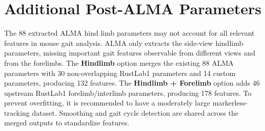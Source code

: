 \documentclass[11pt]{article}
\renewcommand{\[}{%
  \par\smallskip\noindent
  \begin{center}%
  \setlength{\fboxsep}{5pt}%
  \setlength{\fboxrule}{0.35pt}%
  \begin{lrbox}{\almaEquationBox}%
  $\displaystyle
}
\renewcommand{\]}{%
  $%
  \end{lrbox}%
  \fcolorbox{equationLine}{equationBack}{\usebox{\almaEquationBox}}%
  \end{center}%
  \smallskip\par
}
\begin{document}
\section{Additional Post-ALMA Parameters}

The 88 extracted ALMA hind limb parameters may not account for all relevant features in mouse gait analysis. ALMA only extracts the side-view hindlimb parameters, missing important gait features observable from different views and from the forelimbs. The \textbf{Hindlimb} option merges the existing 88 ALMA parameters with 30 non-overlapping RustLab1 parameters and 14 custom parameters, producing 132 features. The \textbf{Hindlimb + Forelimb} option adds 46 upstream RustLab1 forelimb/interlimb parameters, producing 178 features. To prevent overfitting, it is recommended to have a moderately large markerless-tracking dataset. Smoothing and gait cycle detection are shared across the merged outputs to standardize features.
\end{document}
